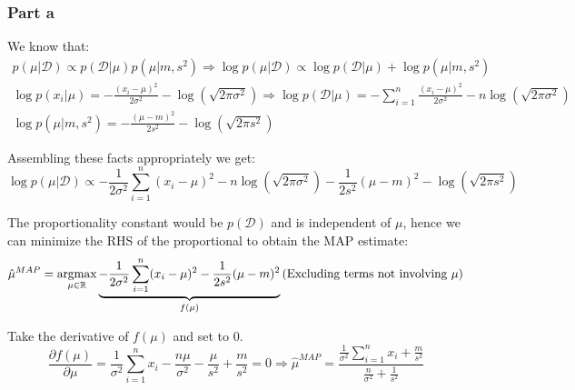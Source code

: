 \documentclass{article}
\newcommand{\argmax}{\mathop{\mathrm{argmax}}}
\begin{document}
\subsubsection*{Part a}
\begin{flushleft}
We know that:
\begin{gather}
p(\mu | \mathcal{D}) \propto p(\mathcal{D} | \mu) p(\mu | m, s^{2}) \Rightarrow \log p(\mu | \mathcal{D}) \propto \log p(\mathcal{D} | \mu) + \log p(\mu | m, s^{2})\\
\log p(x_{i} | \mu) = -\frac{(x_{i} - \mu)^{2}}{2\sigma^{2}} - \log(\sqrt{2 \pi \sigma^{2}}) \Rightarrow \log p(\mathcal{D} | \mu) = \displaystyle -\sum_{i=1}^{n} \frac{(x_{i} - \mu)^{2}}{2\sigma^{2}} - n\log(\sqrt{2\pi\sigma^{2}})\\
\log p(\mu | m, s^{2}) = -\frac{(\mu - m)^2}{2s^2} - \log(\sqrt{2\pi s^{2}})
\end{gather}

Assembling these facts appropriately we get:
\begin{equation}
\log p(\mu | \mathcal{D}) \propto -\frac{1}{2\sigma^{2}} \sum_{i=1}^{n} (x_{i} - \mu)^{2} - n\log(\sqrt{2\pi\sigma^{2}}) - \frac{1}{2s^{2}} (\mu - m)^{2} - \log(\sqrt{2\pi s^{2}})
\end{equation}

The proportionality constant would be \(p(\mathcal{D})\) and is independent of \(\mu\), hence we can minimize the RHS of the proportional to obtain the MAP estimate:
\begin{equation}
\hat{\mu}^{MAP} = \argmax_{\mu \in \mathbb{R}} \underbrace{-\frac{1}{2\sigma^{2}} \sum_{i=1}^{n} (x_{i} - \mu)^{2} - \frac{1}{2s^{2}} (\mu - m)^{2}}_{f(\mu)} \text{(\hfill Excluding terms not involving \(\mu\))}
\end{equation}

Take the derivative of \(f(\mu)\) and set to 0.
\begin{equation}
\label{map-estimate-414}
\frac{\partial f(\mu)}{\partial \mu} = \frac{1}{\sigma^2}\sum_{i=1}^{n}x_{i} - \frac{n\mu}{\sigma^{2}} - \frac{\mu}{s^2} + \frac{m}{s^2} = 0 \Rightarrow \hat{\mu}^{MAP} = \frac{\displaystyle \frac{1}{\sigma^{2}} \sum_{i=1}^{n} x_{i} + \frac{m}{s^2}}{\displaystyle \frac{n}{\sigma^{2}} + \frac{1}{s^2}}
\end{equation}
\end{flushleft}
\end{document}
